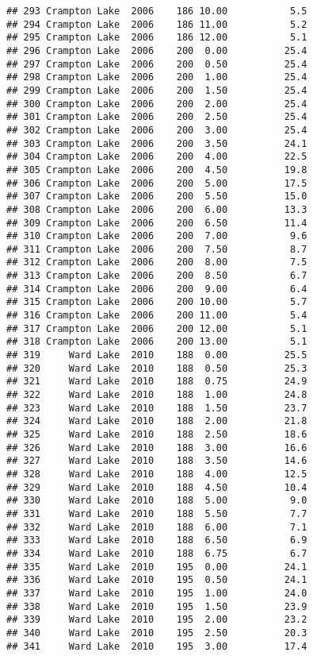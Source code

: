 \documentclass[
]{article}
\begin{document}
\begin{verbatim}
## 293 Crampton Lake  2006    186 10.00           5.5
## 294 Crampton Lake  2006    186 11.00           5.2
## 295 Crampton Lake  2006    186 12.00           5.1
## 296 Crampton Lake  2006    200  0.00          25.4
## 297 Crampton Lake  2006    200  0.50          25.4
## 298 Crampton Lake  2006    200  1.00          25.4
## 299 Crampton Lake  2006    200  1.50          25.4
## 300 Crampton Lake  2006    200  2.00          25.4
## 301 Crampton Lake  2006    200  2.50          25.4
## 302 Crampton Lake  2006    200  3.00          25.4
## 303 Crampton Lake  2006    200  3.50          24.1
## 304 Crampton Lake  2006    200  4.00          22.5
## 305 Crampton Lake  2006    200  4.50          19.8
## 306 Crampton Lake  2006    200  5.00          17.5
## 307 Crampton Lake  2006    200  5.50          15.0
## 308 Crampton Lake  2006    200  6.00          13.3
## 309 Crampton Lake  2006    200  6.50          11.4
## 310 Crampton Lake  2006    200  7.00           9.6
## 311 Crampton Lake  2006    200  7.50           8.7
## 312 Crampton Lake  2006    200  8.00           7.5
## 313 Crampton Lake  2006    200  8.50           6.7
## 314 Crampton Lake  2006    200  9.00           6.4
## 315 Crampton Lake  2006    200 10.00           5.7
## 316 Crampton Lake  2006    200 11.00           5.4
## 317 Crampton Lake  2006    200 12.00           5.1
## 318 Crampton Lake  2006    200 13.00           5.1
## 319     Ward Lake  2010    188  0.00          25.5
## 320     Ward Lake  2010    188  0.50          25.3
## 321     Ward Lake  2010    188  0.75          24.9
## 322     Ward Lake  2010    188  1.00          24.8
## 323     Ward Lake  2010    188  1.50          23.7
## 324     Ward Lake  2010    188  2.00          21.8
## 325     Ward Lake  2010    188  2.50          18.6
## 326     Ward Lake  2010    188  3.00          16.6
## 327     Ward Lake  2010    188  3.50          14.6
## 328     Ward Lake  2010    188  4.00          12.5
## 329     Ward Lake  2010    188  4.50          10.4
## 330     Ward Lake  2010    188  5.00           9.0
## 331     Ward Lake  2010    188  5.50           7.7
## 332     Ward Lake  2010    188  6.00           7.1
## 333     Ward Lake  2010    188  6.50           6.9
## 334     Ward Lake  2010    188  6.75           6.7
## 335     Ward Lake  2010    195  0.00          24.1
## 336     Ward Lake  2010    195  0.50          24.1
## 337     Ward Lake  2010    195  1.00          24.0
## 338     Ward Lake  2010    195  1.50          23.9
## 339     Ward Lake  2010    195  2.00          23.2
## 340     Ward Lake  2010    195  2.50          20.3
## 341     Ward Lake  2010    195  3.00          17.4

\end{verbatim}
\end{document}

